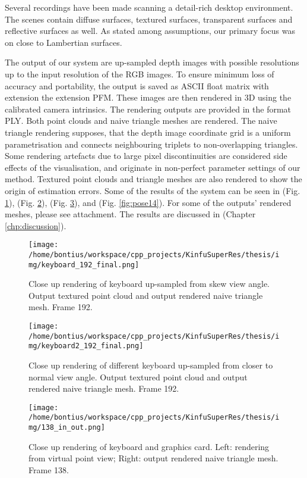 \documentclass{ucl_thesis}
\newcommand{\figref}[1]{(Fig. \ref{#1})}
\newcommand{\chpref}[1]{(Chapter \ref{#1})}
\begin{document}
\par Several recordings have been made scanning a detail-rich desktop environment. The scenes contain diffuse surfaces, textured surfaces, transparent surfaces and reflective surfaces as well. As stated among assumptions, our primary focus was on close to Lambertian surfaces. 
\par The output of our system are up-sampled depth images with possible resolutions up to the input resolution of the RGB images. To ensure minimum loss of accuracy and portability, the output is saved as ASCII float matrix with extension the extension PFM. These images are then rendered in 3D using the calibrated camera intrinsics. The rendering outputs are provided in the format PLY. Both point clouds and naive triangle meshes are rendered. The naive triangle rendering supposes, that the depth image coordinate grid is a uniform parametrisation and connects neighbouring triplets to non-overlapping triangles. Some rendering artefacts due to large pixel discontinuities are considered side effects of the visualisation, and originate in non-perfect parameter settings of our method. Textured point clouds and triangle meshes are also rendered to show the origin of estimation errors. Some of the results of the system can be seen in \figref{fig:keyboard_192_final}, \figref{fig:keyboard2_192_final}, \figref{fig:pose_138_in_out}, and \figref{fig:pose14}. For some of the outputs' rendered meshes, please see attachment. The results are discussed in \chpref{chp:discussion}.

\begin{figure}[h!]\centering
    \texttt{[image: /home/bontius/workspace/cpp\_projects/KinfuSuperRes/thesis/img/keyboard\_192\_final.png]}
    \caption{Close up rendering of keyboard up-sampled from skew view angle. Output textured point cloud and output rendered naive triangle mesh. Frame 192.}
    \label{fig:keyboard_192_final}
\end{figure}

\begin{figure}[h!]\centering
    \texttt{[image: /home/bontius/workspace/cpp\_projects/KinfuSuperRes/thesis/img/keyboard2\_192\_final.png]}
    \caption{Close up rendering of different keyboard up-sampled from closer to normal view angle. Output textured point cloud and output rendered naive triangle mesh. Frame 192.}
    \label{fig:keyboard2_192_final}
\end{figure}

\begin{figure}[h!]\centering
    \texttt{[image: /home/bontius/workspace/cpp\_projects/KinfuSuperRes/thesis/img/138\_in\_out.png]}
    \caption{Close up rendering of keyboard and graphics card. Left: rendering from virtual point view; Right: output rendered naive triangle mesh. Frame 138.}
    \label{fig:pose_138_in_out}
\end{figure}
\end{document}

